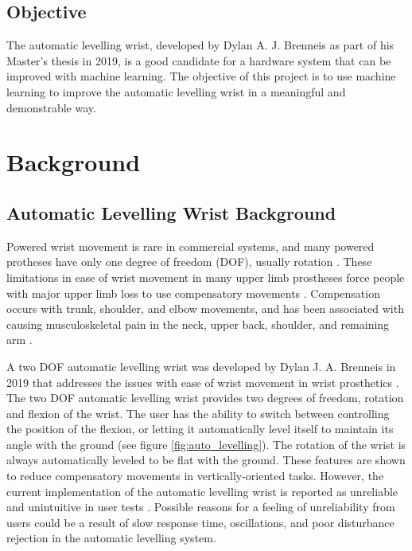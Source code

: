 \documentclass[letterpaper,12pt]{article}
\begin{document}
\subsection{Objective}
The automatic levelling wrist, developed by Dylan A. J. Brenneis as part of his Master's thesis in 2019, \cite{d.j.a.brenneis} is a good candidate for a hardware system that can be improved with machine learning. The objective of this project is to use machine learning to improve the automatic levelling wrist in a meaningful and  demonstrable way.


\section{Background}
\subsection{Automatic Levelling Wrist Background}
Powered wrist movement is rare in commercial systems, and many powered protheses have only one degree of freedom (DOF), usually rotation \cite{n.m.bajaj}. These limitations in ease of wrist movement in many upper limb prostheses force people with major upper limb loss to use compensatory movements \cite{s.l.carey}. Compensation occurs with trunk, shoulder, and elbow movements, and has been associated with causing musculoskeletal pain in the neck, upper back, shoulder, and remaining arm \cite{k.ostlie}.

A two DOF automatic levelling wrist was developed by Dylan J. A. Brenneis in 2019 that addresses the issues with ease of wrist movement in wrist prosthetics \cite{d.j.a.brenneis}. The two DOF automatic levelling wrist provides two degrees of freedom, rotation and flexion of the wrist. The user has the ability to switch between controlling the position of the flexion, or letting it automatically level itself to maintain its angle with the ground (see figure \ref{fig:auto_levelling}). The rotation of the wrist is always automatically leveled to be flat with the ground. These features are shown to reduce compensatory movements in vertically-oriented tasks. However, the current implementation of the automatic levelling wrist is reported as unreliable and unintuitive in user tests \cite{d.j.a.brenneis}. Possible reasons for a feeling of unreliability from users could be a result of slow response time, oscillations, and poor disturbance rejection in the automatic levelling system.
\end{document}
